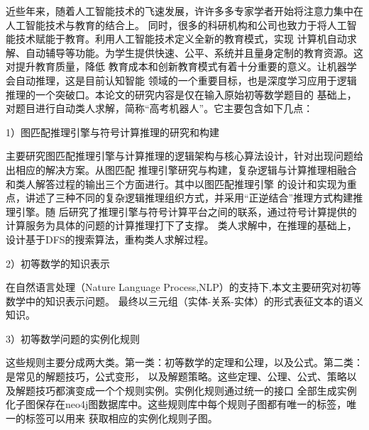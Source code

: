 \documentclass{standalone}
\begin{document}
	
\begin{chineseabstract}
近些年来，随着人工智能技术的飞速发展，许许多多专家学者开始将注意力集中在人工智能技术与教育的结合上。
同时，很多的科研机构和公司也致力于将人工智能技术赋能于教育。利用人工智能技术定义全新的教育模式，实现
计算机自动求解、自动辅导等功能。为学生提供快速、公平、系统并且量身定制的教育资源。这对提升教育质量，降低
教育成本和创新教育模式有着十分重要的意义。让机器学会自动推理，这是目前认知智能
领域的一个重要目标，也是深度学习应用于逻辑推理的一个突破口。本论文的研究内容是仅在输入原始初等数学题目的
基础上，对题目进行自动类人求解，简称“高考机器人”。它主要包含如下几点：

1）图匹配推理引擎与符号计算推理的研究和构建

主要研究图匹配推理引擎与计算推理的逻辑架构与核心算法设计，针对出现问题给出相应的解决方案。从图匹配
推理引擎研究与构建，复杂逻辑与计算推理相融合和类人解答过程的输出三个方面进行。其中以图匹配推理引擎
的设计和实现为重点，讲述了三种不同的复杂逻辑推理组织方式，并采用“正逆结合”推理方式构建推理引擎。随
后研究了推理引擎与符号计算平台之间的联系，通过符号计算提供的计算服务为具体的问题的计算推理打下了支撑。
类人求解中，在推理的基础上，设计基于DFS的搜索算法，重构类人求解过程。

2）初等数学的知识表示

在自然语言处理（Nature Language Process,NLP）的支持下,本文主要研究对初等数学中的知识表示问题。
最终以三元组（实体-关系-实体）的形式表征文本的语义知识。

3）初等数学问题的实例化规则

这些规则主要分成两大类。第一类：初等数学的定理和公理，以及公式。第二类：是常见的解题技巧，公式变形，
以及解题策略。这些定理、公理、公式、策略以及解题技巧都演变成一个个规则实例。实例化规则通过统一的接口
全部生成实例化子图保存在neo4j图数据库中。这些规则库中每个规则子图都有唯一的标签，唯一的标签可以用来
获取相应的实例化规则子图。


\end{chineseabstract}
\end{document}
